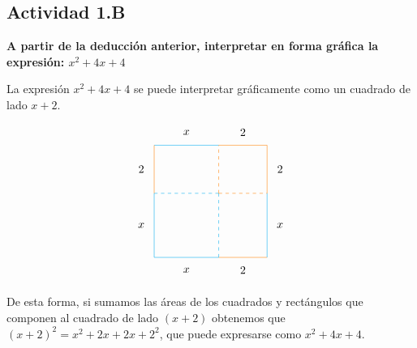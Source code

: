 \subsection*{Actividad 1.B}
\textbf{A partir de la deducción anterior, interpretar en forma gráfica la expresión: $x^2 + 4x + 4$}

La expresión $x^2 + 4x + 4$ se puede interpretar gráficamente como un cuadrado de lado $x + 2$.

\begin{align*}
\begin{tikzpicture}
\draw[cyan] (0,0) -- (2,0);
\draw[cyan] (0,0) -- (0,2);
\draw[cyan,dashed] (2,0) -- (2,2);
\draw[cyan,dashed] (0,2) -- (2,2);
\draw (1, -0.4) node{$x$};
\draw (-0.4, 1) node{$x$};
\draw[orange,dashed] (2,2) -- (3.5,2);
\draw[orange,dashed] (2,2) -- (2,3.5);
\draw[orange] (3.5,2) -- (3.5,3.5);
\draw[orange] (2,3.5) -- (3.5,3.5);
\draw (3.9, 2.75) node{$2$};
\draw (2.75, 3.9) node{$2$};
\draw[orange] (2,0) -- (3.5,0);
\draw (2.75, -0.4) node{$2$};
\draw[cyan] (3.5, 0) -- (3.5, 2);
\draw (3.9, 1) node{$x$};
\draw[cyan] (0, 3.5) -- (2, 3.5);
\draw (1, 3.9) node{$x$};
\draw[orange] (0, 2) -- (0, 3.5);
\draw (-0.4, 2.75) node{$2$};
\end{tikzpicture}
\end{align*}

De esta forma, si sumamos las áreas de los cuadrados y rectángulos que componen al cuadrado de lado $(x+2)$ obtenemos que $(x+2)^2 = x^2 + 2x + 2x + 2^2$, que puede expresarse como $x^2 + 4x +4$.
